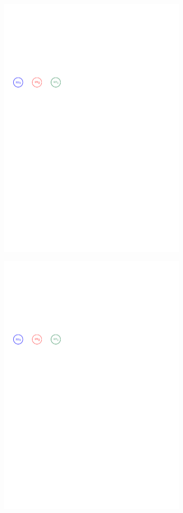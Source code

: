 \documentclass[11pt]{article}
\theoremstyle{definition}
\begin{document}
\begin{figure}[h]
   \begin{subfigure}{.33\textwidth}
     \centering
     \includegraphics[width=.7\linewidth,page=1]{figs/mesh2}
     \caption{}
     \label{fig:tree1}
   \end{subfigure}%
   \begin{subfigure}{.33\textwidth}
     \centering
     \includegraphics[width=.7\linewidth,page=2]{figs/mesh2}

\end{subfigure}
\end{figure}
\end{document}
